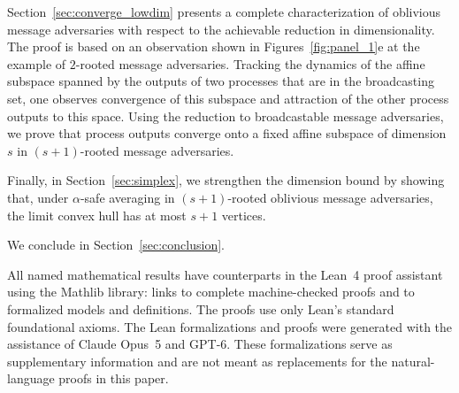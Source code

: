 \documentclass[preprint,12pt,a4paper]{elsarticle}
\theoremstyle{plain}
\theoremstyle{definition}
\begin{document}
Section~\ref{sec:converge_lowdim} presents a complete characterization of oblivious message adversaries with respect to the achievable reduction in dimensionality.
The proof is based on an observation shown in Figures~\ref{fig:panel_1}e at the example of $2$-rooted message adversaries.
Tracking the dynamics of the affine subspace spanned by the outputs of two processes that are in the broadcasting set, one observes convergence of this subspace and attraction of the other process outputs to this space.
Using the reduction to broadcastable message adversaries, we prove that process outputs converge onto a fixed affine subspace of dimension $s$ in $(s+1)$-rooted message adversaries.

Finally, in Section~\ref{sec:simplex}, we strengthen the dimension bound by showing
  that, under $\alpha$-safe averaging in $(s+1)$-rooted oblivious message adversaries,
  the limit convex hull has at most $s+1$ vertices.

We conclude in Section~\ref{sec:conclusion}.

All named mathematical results have counterparts in the Lean~4 proof assistant~\cite{lean4} using the Mathlib library: \leanproof{} links to complete machine-checked proofs and \leanformalized{} to formalized models and definitions.
The proofs use only Lean's standard foundational axioms.
The Lean formalizations and proofs were generated with the assistance of Claude Opus~5 and GPT-6.
These formalizations serve as supplementary information and are not meant as replacements for the natural-language proofs in this paper.
\end{document}
